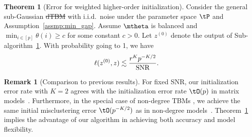 \documentclass[lettersize,onecolumn,journal]{IEEEtran}
\theoremstyle{definition}
\newtheorem{thm}{Theorem}
\theoremstyle{definition}
\newtheorem{rmk}{Remark}
\providecommand{\DIFaddtex}[1]{{\protect\color{blue}\uwave{#1}}} %
\providecommand{\DIFdeltex}[1]{{\protect\color{red}\sout{#1}}}                      %
\providecommand{\DIFaddbegin}{} %
\providecommand{\DIFaddend}{} %
\providecommand{\DIFdelbegin}{} %
\providecommand{\DIFdelend}{} %
\providecommand{\DIFadd}[1]{\texorpdfstring{\DIFaddtex{#1}}{#1}} %
\providecommand{\DIFdel}[1]{\texorpdfstring{\DIFdeltex{#1}}{}} %
\newcommand{\DIFscaledelfig}{0.5}
\newlength{\DIFdelgraphicswidth} %
\newlength{\DIFdelgraphicsheight} %
\newcommand{\DIFaddincludegraphics}[2][]{{\color{blue}\fbox{\DIFOincludegraphics[#1]{#2}}}} %
\newcommand{\DIFdelincludegraphics}[2][]{%
\sbox{\DIFdelgraphicsbox}{\DIFOincludegraphics[#1]{#2}}%
\settoboxwidth{\DIFdelgraphicswidth}{\DIFdelgraphicsbox} %
\settoboxtotalheight{\DIFdelgraphicsheight}{\DIFdelgraphicsbox} %
\scalebox{\DIFscaledelfig}{%
\parbox[b]{\DIFdelgraphicswidth}{\usebox{\DIFdelgraphicsbox}\\[-\baselineskip] \rule{\DIFdelgraphicswidth}{0em}}\llap{\resizebox{\DIFdelgraphicswidth}{\DIFdelgraphicsheight}{%
\setlength{\unitlength}{\DIFdelgraphicswidth}%
\begin{picture}(1,1)%
\thicklines\linethickness{2pt} %
{\color[rgb]{1,0,0}\put(0,0){\framebox(1,1){}}}%
{\color[rgb]{1,0,0}\put(0,0){\line( 1,1){1}}}%
{\color[rgb]{1,0,0}\put(0,1){\line(1,-1){1}}}%
\end{picture}%
}\hspace*{3pt}}} %
} %
\DeclareRobustCommand{\DIFaddbegin}{\DIFOaddbegin \let\includegraphics\DIFaddincludegraphics} %
\DeclareRobustCommand{\DIFaddend}{\DIFOaddend \let\includegraphics\DIFOincludegraphics} %
\DeclareRobustCommand{\DIFdelbegin}{\DIFOdelbegin \let\includegraphics\DIFdelincludegraphics} %
\DeclareRobustCommand{\DIFdelend}{\DIFOaddend \let\includegraphics\DIFOincludegraphics} %
\begin{document}
\begin{thm}[Error for weighted higher-order initialization]\label{thm:initial} Consider the general \DIFdelbegin %
\DIFdelend sub-Gaussian \DIFdelbegin %
\DIFdel{dTBM }%
\DIFdelend \DIFaddbegin \DIFadd{dTBM }\DIFaddend with i.i.d.\ noise \DIFdelbegin %
\DIFdelend under the parameter space $\tP$ and Assumption~\ref{assmp:min_gap}. %
Assume $\mtheta$ is balanced and $\min_{i\in[p]}\theta(i) \geq c$ for some constant $c>0$. Let $ z^{(0)}$ denote the output of Sub-algorithm~\hyperref[alg:main]{1}. With probability going to 1, we have
\begin{equation}\label{eq:ini}
   \ell(z^{(0)}, z) \lesssim {r^K p^{-K/2}\over \text{SNR}}. 
\end{equation}
\end{thm}

\begin{rmk}[Comparison to previous results] For fixed SNR, our initialization error rate with $K=2$ agrees with the initialization error rate \DIFdelbegin \DIFdel{$\tO(p)$ }\DIFdelend \DIFaddbegin \DIFadd{$\tO(p^{-1})$ }\DIFaddend in matrix models~\citep{gao2018community}. Furthermore, in the special case of non-degree TBMs \DIFaddbegin \DIFadd{with $\theta_1=\cdots=\theta_p=1$}\DIFaddend , we achieve the same initial misclustering error $\tO(p^{-K/2})$ as in non-degree models~\citep{han2020exact}. Theorem~\ref{thm:initial} implies the advantage of our algorithm in achieving both accuracy and model flexibility. 
\end{rmk}



\DIFdelbegin %
\end{document}

